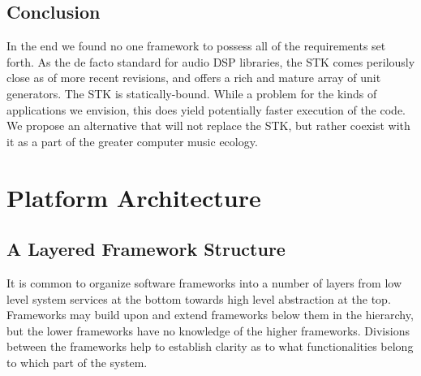 \documentclass[twoside,10pt]{article}
\begin{document}


\subsection{Conclusion} %

In the end we found no one framework to possess all of the requirements set forth.  As the de facto standard for audio DSP libraries, the STK comes perilously close as of more recent revisions\cite{Scavone:2005}, and offers a rich and mature array of unit generators.  The STK is statically-bound.  While a problem for the kinds of applications we envision, this does yield potentially faster execution of the code.  We propose an alternative that will not replace the STK, but rather coexist with it as a part of the greater computer music ecology.


%






\section{Platform Architecture} %

\subsection{A Layered Framework Structure}

It is common to organize software frameworks into a number of layers from low level system services at the bottom towards high level abstraction at the top.  Frameworks may build upon and extend frameworks below them in the hierarchy, but the lower frameworks have no knowledge of the higher frameworks. Divisions between the frameworks help to establish clarity as to what functionalities belong to which part of the system. 
\end{document}

